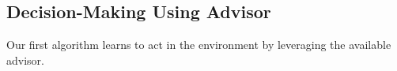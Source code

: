 \documentclass[jair, twoside,11pt,theapa]{article}
\begin{document}





\subsection{Decision-Making Using Advisor}

Our first algorithm learns to  act in the environment by leveraging the available advisor. 

\end{document}
